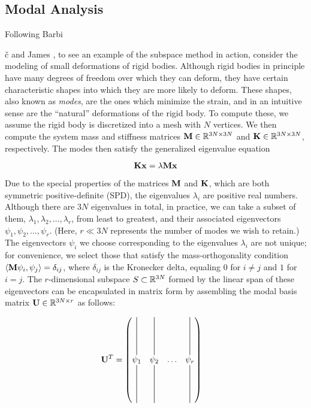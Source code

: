 \subsection{Modal Analysis}
\label{sec:modal}
Following Barbi{\v{c} and James \cite{barbivc2005real}, to see an example of the subspace method in action, consider the modeling of small deformations of rigid bodies. Although rigid bodies in principle have many degrees of freedom over which they can deform, they have certain characteristic shapes into which they are more likely to deform. These shapes, also known as {\em modes}, are the ones which minimize the strain, and in an intuitive sense are the ``natural'' deformations of the rigid body. To compute these, we assume the rigid body is discretized into a mesh with $N$ vertices. We then compute the system mass and stiffness matrices $\mathbf{M} \in \mathbb{R}^{3N \times 3N}$ and $\mathbf{K} \in \mathbb{R}^{3N \times 3N}$, respectively. The modes then satisfy the generalized eigenvalue equation

\begin{equation}
	\mathbf{K} \mathbf{x} = \lambda \mathbf{M} \mathbf{x}
\end{equation}

Due to the special properties of the matrices $\mathbf{M}$ and $\mathbf{K}$, which are both symmetric positive-definite (SPD), the eigenvalues $\lambda_i$ are positive real numbers. 
Although there are $3N$ eigenvalues in total, in practice, we can take a subset of them, $\lambda_1, \lambda_2, \dots, \lambda_r$, from least to greatest, and their associated eigenvectors
 $\psi_1, \psi_2, \dots, \psi_r$. (Here, $r \ll 3N$ represents the number of modes we wish to retain.) The eigenvectors $\psi_i$ we choose corresponding to the eigenvalues $\lambda_i$ 
 are not unique; for convenience, we select those that satisfy the mass-orthogonality condition $\langle \mathbf{M} \psi_i, \psi_j \rangle = \delta_{ij}$, where $\delta_{ij}$ is the Kronecker delta, 
 equaling $0$ for $i \neq j$ and $1$ for $i=j$. The $r$-dimensional subspace $S \subset \mathbb{R}^{3N}$ formed by the linear span of these eigenvectors can be encapsulated in matrix form 
 by assembling the modal basis matrix $\mathbf{U} \in \mathbb{R}^{3N \times r}$ as follows:

\begin{align}
	\UU^{T} &= \begin{pmatrix}
	\vertbar & \vertbar &   & \vertbar \\
	\psi_1 & \psi_2 & \dots & \psi_r   \\
	\vertbar & \vertbar &   & \vertbar
  \end{pmatrix}
\end{align}

}
